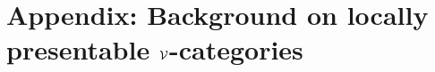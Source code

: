 
\appendix
\chapter*{Appendix: Background on locally presentable $\mathcal{V}$-categories}\label{appendix}



